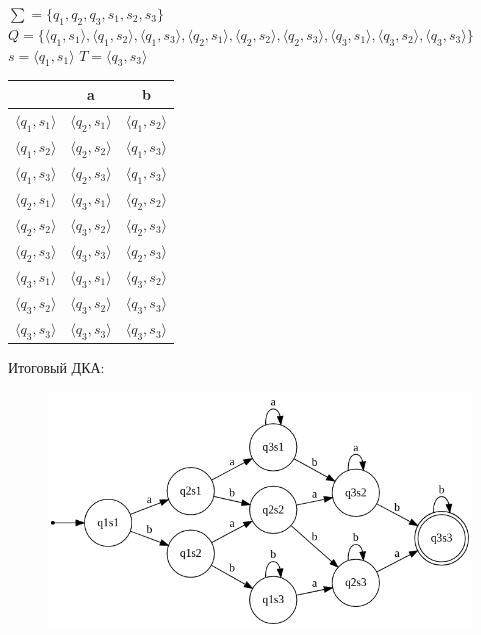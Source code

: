 \documentclass[a4paper,12pt]{article}
\begin{document}
$\sum = \{q_1, q_2, q_3, s_1, s_2, s_3\}$\newline
\normalsize $Q = \{\langle q_1 , s_1 \rangle ,\langle q_1 , s_2 \rangle ,\langle q_1 , s_3 \rangle , \langle q_2 , s_1 \rangle , \langle q_2 , s_2 \rangle , \langle q_2 , s_3 \rangle , \langle q_3 , s_1 \rangle , \langle q_3 , s_2 \rangle , \langle q_3 , s_3 \rangle \}$\newline
\Large $s = \langle q_1 , s_1 \rangle$\newline
$T = \langle q_3 , s_3 \rangle$\newline
\begin{center}
\begin{tabular}{ |c|c|c| } 
\hline
  & a & b \\ [0.5ex] 
 \hline
 $\langle q_1 , s_1 \rangle$ & $\langle q_2 , s_1 \rangle$ & $\langle q_1 , s_2 \rangle$ \\ 
 $\langle q_1 , s_2 \rangle $ & $\langle q_2 , s_2 \rangle$ & $\langle q_1 , s_3 \rangle$ \\ 
 $\langle q_1 , s_3 \rangle $ & $\langle q_2 , s_3 \rangle$ & $\langle q_1 , s_3 \rangle$ \\ 
 $\langle q_2 , s_1 \rangle $ & $\langle q_3 , s_1 \rangle$ & $\langle q_2 , s_2 \rangle$ \\ 
 $\langle q_2 , s_2 \rangle $ & $\langle q_3 , s_2 \rangle$ & $\langle q_2 , s_3 \rangle$ \\
 $\langle q_2 , s_3 \rangle $ & $\langle q_3 , s_3 \rangle$ & $\langle q_2 , s_3 \rangle$ \\
 $\langle q_3 , s_1 \rangle $ & $\langle q_3 , s_1 \rangle$ & $\langle q_3 , s_2 \rangle$ \\
 $\langle q_3 , s_2 \rangle $ & $\langle q_3 , s_2 \rangle$ & $\langle q_3 , s_3 \rangle$ \\
 $\langle q_3 , s_3 \rangle $ & $\langle q_3 , s_3 \rangle$ & $\langle q_3 , s_3 \rangle$ \\
 \hline
\end{tabular}
\end{center}
\endgroup
Итоговый ДКА: \newline
\begin{figure}[h]
\centering
\includegraphics[scale=0.6]{2_1}
\end{figure}
\end{document}
